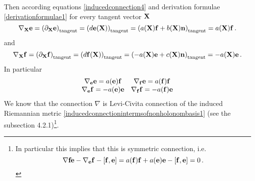 \documentclass[12pt]{article}
\theoremstyle{theorem}
\numberwithin{equation}{section}
\begin{document}
    Then according equations \eqref{inducedconnection4} and derivation formulae \eqref{derivationformulae1}
    for every tangent vector ${\bf X}$
        \begin{equation}\label{inducedconnectionintermsofnonholonombasis1}
        \nabla_{\bf X} {\bf e}=\left(\partial_{\bf X}{\bf e}\right)_{\rm tangent}=\left(d{\bf e}({\bf X})\right)_{\rm tangent}=
        \left(a({\bf X}){\bf f}+b({\bf X}){\bf n}\right)_{\rm tangent}=a({\bf X}){\bf f}\,.
        \end{equation}
and
    \begin{equation}\label{inducedconnectionintermsofnonholonombasis2}
        \nabla_{\bf X} {\bf f}=\left(\partial_{\bf X}{\bf f}\right)_{\rm tangent}=\left(d{\bf f}({\bf X})\right)_{\rm tangent}=
        \left(-a({\bf X}){\bf e}+c({\bf X}){\bf n}\right)_{\rm tangent}=-a({\bf X}){\bf e}\,.
        \end{equation}
 In particular
              \begin{equation}\label{inducedconnectionintermsofnonholonombasis3}
              \begin{matrix}
        \nabla_{\bf e} {\bf e}=a({\bf e}){\bf f}  &   \nabla_{\bf f} {\bf e}=a({\bf f}){\bf f}\cr
        \nabla_{\bf e} {\bf f}=-a({\bf e}){\bf e}  &   \nabla_{\bf f} {\bf f}=-a({\bf f}){\bf e}\cr
        \end{matrix}
        \end{equation}
We know that the connection $\nabla$ is Levi-Civita connection of the induced Riemannian metric
\eqref{inducedconnectionintermsofnonholonombasis1} (see the subsection 4.2.1)\footnote{In
particular this implies that this is symmetric connection, i.e.
\begin{equation}\label{commutatorofvectorfields}
    \nabla{\bf f}{\bf e}-\nabla_{\bf e}{\bf f}-[{\bf f},{\bf e}]=a({\bf f}){\bf f}+a({\bf e}){\bf e}-[{\bf f},{\bf e}]=0\,.
\end{equation}
}.
\end{document}
